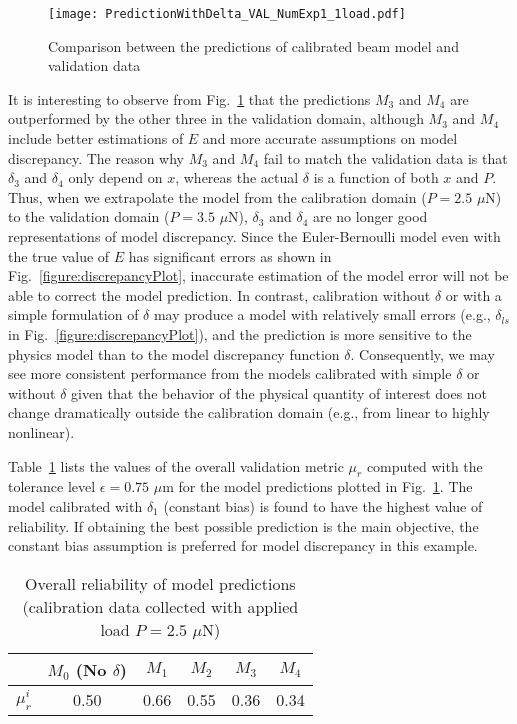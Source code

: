 \documentclass[preprint,review,12pt,3p]{elsarticle}
\begin{document}
\begin{figure}[h!]
\centering
\texttt{[image: PredictionWithDelta\_VAL\_NumExp1\_1load.pdf]}
\caption{Comparison between the predictions of calibrated beam model and validation data}
\label{figure:predictionVAL-NumExp-1-1load}
\end{figure}

It is interesting to observe from Fig.~\ref{figure:predictionVAL-NumExp-1-1load} that the predictions $M_3$ and $M_4$ are outperformed by the other three in the validation domain, although $M_3$ and $M_4$ include better estimations of $E$ and more accurate assumptions on model discrepancy. The reason why $M_3$ and $M_4$ fail to match the validation data is that $\delta_3$ and $\delta_4$ only depend on $x$, whereas the actual $\delta$ is a function of both $x$ and $P$. Thus, when we extrapolate the model from the calibration domain ($P=2.5$ $\mu$N) to the validation domain ($P=3.5$ $\mu$N), $\delta_3$ and $\delta_4$ are no longer good representations of model discrepancy. Since the Euler-Bernoulli model even with the true value of $E$ has significant errors as shown in Fig.~\ref{figure:discrepancyPlot}, inaccurate estimation of the model error will not be able to correct the model prediction. In contrast, calibration without $\delta$ or with a simple formulation of $\delta$ may produce a model with relatively small errors (e.g., $\delta_{ls}$ in Fig.~\ref{figure:discrepancyPlot}), and the prediction is more sensitive to the physics model than to the model discrepancy function $\delta$. Consequently, we may see more consistent performance from the models calibrated with simple $\delta$ or without $\delta$ given that the behavior of the physical quantity of interest does not change dramatically outside the calibration domain (e.g., from linear to highly nonlinear). 

Table~\ref{table:overallRM-NumExp-1-1load} lists the values of the overall validation metric $\mu_{r}$ computed with the tolerance level $\epsilon=0.75$ $\mu$m for the model predictions plotted in Fig.~\ref{figure:predictionVAL-NumExp-1-1load}. The model calibrated with $\delta_1$ (constant bias) is found to have the highest value of reliability. If obtaining the best possible prediction is the main objective, the constant bias assumption is preferred for model discrepancy in this example. 


\begin{table}[h!]
\caption{Overall reliability of model predictions (calibration data collected with applied load $P=2.5$ $\mu$N)}
\label{table:overallRM-NumExp-1-1load}
\begin{center}
\begin{tabular}{cccccc}
\hline
& $M_{0}$ (No $\delta$) & $M_1$ & $M_2$ & $M_3$ & $M_4$ \\
\hline
$\mu_r^i$ & 0.50 & 0.66 & 0.55 & 0.36 & 0.34 \\
\hline
\end{tabular}
\end{center}
\end{table}
\end{document}
